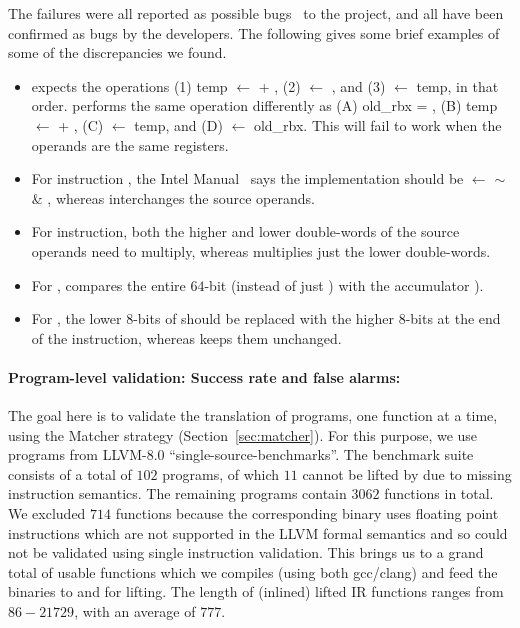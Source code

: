 The \sivFail failures were all reported 
as possible bugs~\cite{Suppl} to the \mcsema project, and all \sivFail 
have been confirmed as bugs by the \mcsema developers.
%
The following gives some brief examples of some of the
discrepancies we found.
\begin{itemize}
    \item {} expects the operations 
    (1) temp $\leftarrow$  + , (2)  
    $\leftarrow$ , and (3)  $\leftarrow$ temp, in that 
    order. \mcsema performs the same operation differently as (A) old\_rbx = 
    , (B) temp $\leftarrow$  + , (C)  
    $\leftarrow$ temp, and (D)  
    $\leftarrow$ old\_rbx. This will fail to  work when the operands 
    are the same registers.

    \item For instruction , the Intel 
    Manual~\cite{IntelManual} says the implementation should be   
    $\leftarrow$ $\sim$ \& , whereas \mcsema 
    interchanges the source operands.
    
    \item For  instruction, both the higher and 
    lower double-words of the source operands need to multiply, whereas 
    \mcsema multiplies just the lower double-words.
    
    \item For  , \mcsema compares the entire $64$-bit 
     (instead of just ) with the accumulator 
    ).
    
    \item For , the lower $8$-bits of  
    should be replaced with the higher $8$-bits at the end of the instruction, whereas 
    \mcsema keeps them unchanged.
\end{itemize}


%
\paragraph{Program-level validation: Success rate and false alarms:}
%
The goal here is to validate the translation of programs, one function at a 
time, using the Matcher strategy (Section~\ref{sec:matcher}). For this purpose, 
we use programs from LLVM-8.0 ``single-source-benchmarks''. The benchmark suite
consists of a total of $102$ programs, of which $11$ cannot be lifted by 
\mcsema due to missing instruction semantics. The remaining programs 
contain $3062$ functions in total. We excluded $714$ functions because  the 
corresponding binary uses floating point instructions which are not supported
in the LLVM formal semantics and so could not be validated using single 
instruction validation. This 
brings us to a grand total of \plvT usable functions which we compiles (using 
both gcc/clang) and feed the binaries to \compd and \mcsema for lifting. The 
length of (inlined) lifted IR functions ranges from $86-21729$, with an average 
of $777$.

